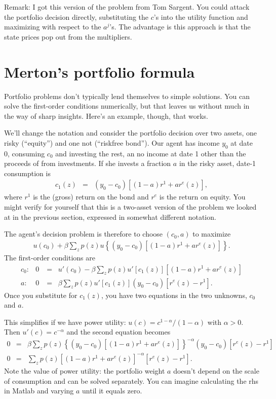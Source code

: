 Remark:  I got this version
of the problem from Tom Sargent.
You could attack the portfolio decision directly,
substituting the $c$'s into the utility function
and maximizing with respect to the $a^j$'s.
The advantage is this approach is that the state prices
pop out from the multipliers.


\section{Merton's portfolio formula}

Portfolio problems don't typically lend themselves
to simple solutions.
You can solve the first-order conditions numerically,
but that leaves us without much in the way of sharp insights.
Here's an example, though, that works.

We'll change the notation and consider the portfolio decision over two assets,
one risky (``equity'') and one not (``riskfree bond'').
Our agent has income $y_0$ at date 0, consuming $c_0$ and investing the rest,
an no income at date 1 other than the proceeds of from investments.
If she invests a fraction $a$ in the risky asset, date-1 consumption is
\begin{eqnarray*}
    c_1(z) &=& (y_0 - c_0) [(1-a) r^1 + a r^e(z)],
\end{eqnarray*}
where $r^1$ is the (gross) return on the bond and $r^e$ is the return on equity.
You might verify for yourself that this is a two-asset version
of the problem we looked at in the previous section,
expressed in somewhat different notation.

The agent's decision problem is therefore to choose $(c_0,a)$ to maximize
\begin{eqnarray*}
    u(c_0) + \beta \sum_z p(z) u \left\{ (y_0 - c_0) [(1-a) r^1 + a r^e(z)] \right\} .
\end{eqnarray*}
The first-order conditions are
\begin{eqnarray*}
    c_0 :&  0 &=\;\; u'(c_0) - \beta \sum_z p(z) u'[c_1(z)] [(1-a) r^1 + a r^e(z)] \\
    a:&     0 &=\;\; \beta \sum_z p(z) u'[c_1(z)] (y_0-c_0) [ r^e(z)-r^1] .
\end{eqnarray*}
Once you substitute for $c_1(z)$, you have two equations in the two unknowns,
$c_0$ and $a$.

This simplifies if we have power utility:
$u(c) = c^{1-\alpha}/(1-\alpha)$ with $\alpha > 0$.
Then $u'(c) = c^{-\alpha} $ and the second equation becomes
\begin{eqnarray*}
    0 &=& \beta \sum_z p(z) \left\{ (y_0-c_0)[(1-a) r^1 + a r^e(z)]\right\}^{-\alpha} (y_0-c_0) [ r^e(z)-r^1] \\
    0 &=& \sum_z p(z) [(1-a) r^1 + a r^e(z)]^{-\alpha} [ r^e(z)-r^1] .
\end{eqnarray*}
Note the value of power utility:  the portfolio weight $a$ doesn't depend
on the scale of consumption and can be solved separately.
You can imagine calculating the rhs in Matlab
and varying $a$ until it equals zero.

